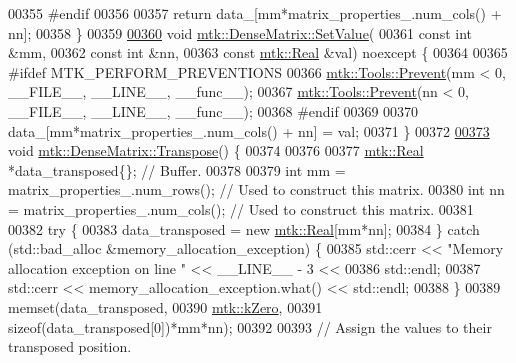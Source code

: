 \begin{DoxyCode}
00355 \textcolor{preprocessor}{  #endif}
00356 
00357   \textcolor{keywordflow}{return} data\_[mm*matrix\_properties\_.num\_cols() + nn];
00358 \}
00359 
\hypertarget{mtk__dense__matrix_8cc_source_l00360}{}\hyperlink{classmtk_1_1DenseMatrix_a784ce5784109ac86bfb9d8562b334b13}{00360} \textcolor{keywordtype}{void}  \hyperlink{classmtk_1_1DenseMatrix_a784ce5784109ac86bfb9d8562b334b13}{mtk::DenseMatrix::SetValue}(
00361     \textcolor{keyword}{const} \textcolor{keywordtype}{int} &mm,
00362     \textcolor{keyword}{const} \textcolor{keywordtype}{int} &nn,
00363     \textcolor{keyword}{const} \hyperlink{group__c01-roots_gac080bbbf5cbb5502c9f00405f894857d}{mtk::Real} &val) noexcept \{
00364 
00365 \textcolor{preprocessor}{  #ifdef MTK\_PERFORM\_PREVENTIONS}
00366   \hyperlink{classmtk_1_1Tools_a332324c6f25e66be9dff48c5987a3b9f}{mtk::Tools::Prevent}(mm < 0, \_\_FILE\_\_, \_\_LINE\_\_, \_\_func\_\_);
00367   \hyperlink{classmtk_1_1Tools_a332324c6f25e66be9dff48c5987a3b9f}{mtk::Tools::Prevent}(nn < 0, \_\_FILE\_\_, \_\_LINE\_\_, \_\_func\_\_);
00368 \textcolor{preprocessor}{  #endif}
00369 
00370   data\_[mm*matrix\_properties\_.num\_cols() + nn] = val;
00371 \}
00372 
\hypertarget{mtk__dense__matrix_8cc_source_l00373}{}\hyperlink{classmtk_1_1DenseMatrix_a71d9c07ca66e88d97d1fd5012f43138b}{00373} \textcolor{keywordtype}{void} \hyperlink{classmtk_1_1DenseMatrix_a71d9c07ca66e88d97d1fd5012f43138b}{mtk::DenseMatrix::Transpose}() \{
00374 
00376 
00377   \hyperlink{group__c01-roots_gac080bbbf5cbb5502c9f00405f894857d}{mtk::Real} *data\_transposed\{\}; \textcolor{comment}{// Buffer.}
00378 
00379   \textcolor{keywordtype}{int} mm = matrix\_properties\_.num\_rows(); \textcolor{comment}{// Used to construct this matrix.}
00380   \textcolor{keywordtype}{int} nn = matrix\_properties\_.num\_cols(); \textcolor{comment}{// Used to construct this matrix.}
00381 
00382   \textcolor{keywordflow}{try} \{
00383     data\_transposed = \textcolor{keyword}{new} \hyperlink{group__c01-roots_gac080bbbf5cbb5502c9f00405f894857d}{mtk::Real}[mm*nn];
00384   \} \textcolor{keywordflow}{catch} (std::bad\_alloc &memory\_allocation\_exception) \{
00385     std::cerr << \textcolor{stringliteral}{"Memory allocation exception on line "} << \_\_LINE\_\_ - 3 <<
00386       std::endl;
00387     std::cerr << memory\_allocation\_exception.what() << std::endl;
00388   \}
00389   memset(data\_transposed,
00390          \hyperlink{group__c01-roots_ga59a451a5fae30d59649bcda274fea271}{mtk::kZero},
00391          \textcolor{keyword}{sizeof}(data\_transposed[0])*mm*nn);
00392 
00393   \textcolor{comment}{// Assign the values to their transposed position.}

\end{DoxyCode}
